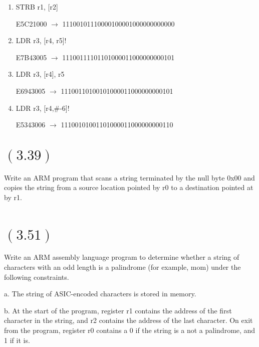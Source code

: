 \documentclass[letterpaper,12pt,titlepage]{article}
\begin{document}
\renewcommand{\labelenumi}{\alph{enumi})}
\begin{enumerate}

\item STRB r1, [r2]

\begin{mdframed}[style=MyFrame]
E5C21000 $\rightarrow$ 11100101110000100001000000000000
\end{mdframed}

\item LDR r3, [r4, r5]!

\begin{mdframed}[style=MyFrame]
E7B43005 $\rightarrow$ 11100111101101000011000000000101
\end{mdframed}

\item LDR r3, [r4], r5

\begin{mdframed}[style=MyFrame]
E6943005 $\rightarrow$ 11100110100101000011000000000101
\end{mdframed}

\item LDR r3, [r4,\#-6]! 

\begin{mdframed}[style=MyFrame]
E5343006 $\rightarrow$ 11100101001101000011000000000110
\end{mdframed}

\end{enumerate}

\newpage
\section*{$(3.39)$} Write an ARM program that scans a string terminated by the null byte 0x00 and copies the string from a source location pointed by r0 to a destination pointed at by r1.
\begin{mdframed}[style=MyFrame]
\begin{verbatim}

\end{verbatim}
\end{mdframed}

\newpage
\section*{$(3.51)$} Write an ARM assembly language program to determine whether a string of characters with an odd length is a palindrome (for example, mom) under the following constraints.

a. The string of ASIC-encoded characters is stored in memory.

b. At the start of the program, register r1 contains the address of the first character in the string, and r2 contains the address of the last character. On exit from the program, register r0 contains a 0 if the string is a not a palindrome, and 1 if it is. \newline






\end{document}

